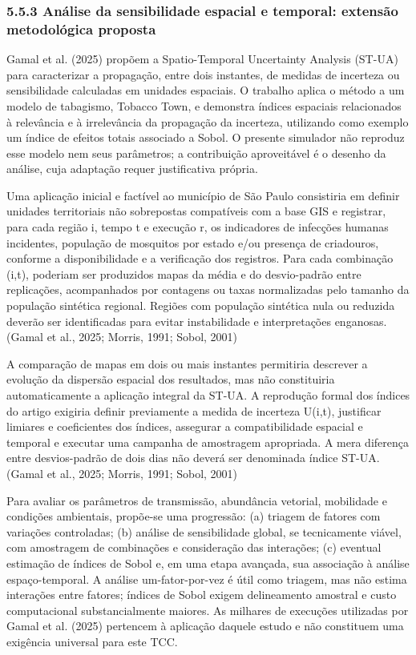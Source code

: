 \subsubsection{5.5.3 Análise da sensibilidade espacial e temporal:
extensão metodológica
proposta}\label{anuxe1lise-da-sensibilidade-espacial-e-temporal-extensuxe3o-metodoluxf3gica-proposta}

Gamal et al. (2025) propõem a Spatio-Temporal Uncertainty Analysis
(ST-UA) para caracterizar a propagação, entre dois instantes, de medidas
de incerteza ou sensibilidade calculadas em unidades espaciais. O
trabalho aplica o método a um modelo de tabagismo, Tobacco Town, e
demonstra índices espaciais relacionados à relevância e à irrelevância
da propagação da incerteza, utilizando como exemplo um índice de efeitos
totais associado a Sobol. O presente simulador não reproduz esse modelo
nem seus parâmetros; a contribuição aproveitável é o desenho da análise,
cuja adaptação requer justificativa própria.

Uma aplicação inicial e factível ao município de São Paulo consistiria
em definir unidades territoriais não sobrepostas compatíveis com a base
GIS e registrar, para cada região i, tempo t e execução r, os
indicadores de infecções humanas incidentes, população de mosquitos por
estado e/ou presença de criadouros, conforme a disponibilidade e a
verificação dos registros. Para cada combinação (i,t), poderiam ser
produzidos mapas da média e do desvio-padrão entre replicações,
acompanhados por contagens ou taxas normalizadas pelo tamanho da
população sintética regional. Regiões com população sintética nula ou
reduzida deverão ser identificadas para evitar instabilidade e
interpretações enganosas. (Gamal et al., 2025; Morris, 1991; Sobol,
2001)

A comparação de mapas em dois ou mais instantes permitiria descrever a
evolução da dispersão espacial dos resultados, mas não constituiria
automaticamente a aplicação integral da ST-UA. A reprodução formal dos
índices do artigo exigiria definir previamente a medida de incerteza
U(i,t), justificar limiares e coeficientes dos índices, assegurar a
compatibilidade espacial e temporal e executar uma campanha de
amostragem apropriada. A mera diferença entre desvios-padrão de dois
dias não deverá ser denominada índice ST-UA. (Gamal et al., 2025;
Morris, 1991; Sobol, 2001)

Para avaliar os parâmetros de transmissão, abundância vetorial,
mobilidade e condições ambientais, propõe-se uma progressão: (a) triagem
de fatores com variações controladas; (b) análise de sensibilidade
global, se tecnicamente viável, com amostragem de combinações e
consideração das interações; (c) eventual estimação de índices de Sobol
e, em uma etapa avançada, sua associação à análise espaço-temporal. A
análise um-fator-por-vez é útil como triagem, mas não estima interações
entre fatores; índices de Sobol exigem delineamento amostral e custo
computacional substancialmente maiores. As milhares de execuções
utilizadas por Gamal et al. (2025) pertencem à aplicação daquele estudo
e não constituem uma exigência universal para este TCC.

